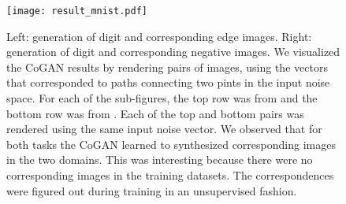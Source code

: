 \documentclass{article}
\begin{document}
\begin{figure}[tbh!]
\centering
\texttt{[image: result\_mnist.pdf]}
\caption{Left: generation of digit and corresponding edge images. Right: generation of digit and corresponding negative images. We visualized the CoGAN results by rendering pairs of images, using the vectors that corresponded to paths connecting two pints in the input noise space. For each of the sub-figures, the top row was from  and the bottom row was from . Each of the top and bottom pairs was rendered using the same input noise vector. We observed that for both tasks the CoGAN learned to synthesized corresponding images in the two domains. This was interesting because there were no corresponding images in the training datasets. The correspondences were figured out during training in an unsupervised fashion.}
\label{fig::result_mnist_edge_vis}
\end{figure}
\end{document}
